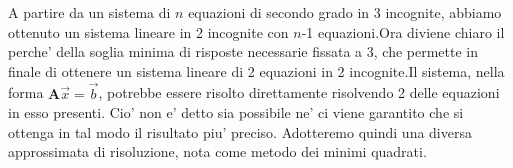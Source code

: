 \documentclass[Lau,binding=0.6cm]{sapthesis}
\begin{document}
A partire da un sistema di $n$ equazioni di secondo grado in 3 incognite, abbiamo ottenuto un sistema lineare in 2 incognite con $n$-1 equazioni.\newline Ora diviene chiaro il perche' della soglia minima di risposte necessarie fissata a 3, che permette in finale di ottenere un sistema lineare di 2 equazioni in 2 incognite.\newline Il sistema, nella forma $\textbf{A}\overrightarrow{x}=\overrightarrow{b}$, potrebbe essere risolto direttamente risolvendo 2 delle equazioni in esso presenti. Cio' non e' detto sia possibile ne' ci viene garantito che si ottenga in tal modo il risultato piu' preciso. Adotteremo quindi una diversa approssimata di risoluzione, nota come metodo dei minimi quadrati.\newline
\end{document}
